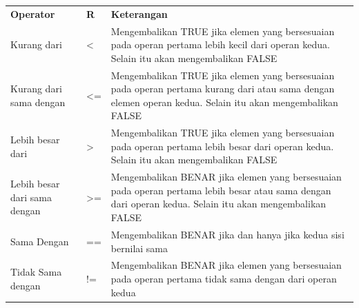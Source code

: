 \documentclass[
]{book}
\begin{document}
\begin{longtable}[]{@{}
  >{\centering\arraybackslash}p{}
  >{\centering\arraybackslash}p{}
  >{\centering\arraybackslash}p{}@{}}
\toprule\noalign{}
\endhead
\bottomrule\noalign{}
\endlastfoot
\textbf{Operator} & \textbf{R} & \textbf{Keterangan} \\
Kurang dari & \textless{} & Mengembalikan TRUE jika elemen yang bersesuaian pada operan pertama lebih kecil dari operan kedua. Selain itu akan mengembalikan FALSE \\
Kurang dari sama dengan & \textless= & Mengembalikan TRUE jika elemen yang bersesuaian pada operan pertama kurang dari atau sama dengan elemen operan kedua. Selain itu akan mengembalikan FALSE \\
Lebih besar dari & \textgreater{} & Mengembalikan TRUE jika elemen yang bersesuaian pada operan pertama lebih besar dari operan kedua. Selain itu akan mengembalikan FALSE \\
Lebih besar dari sama dengan & \textgreater= & Mengembalikan BENAR jika elemen yang bersesuaian pada operan pertama lebih besar atau sama dengan dari operan kedua. Selain itu akan mengembalikan FALSE \\
Sama Dengan & == & Mengembalikan BENAR jika dan hanya jika kedua sisi bernilai sama \\
Tidak Sama dengan & != & Mengembalikan BENAR jika elemen yang bersesuaian pada operan pertama tidak sama dengan dari operan kedua \\
\end{longtable}
\end{document}

